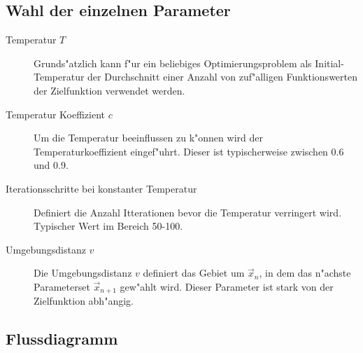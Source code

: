 \subsection{Wahl der einzelnen Parameter}
\begin{description}
\item [Temperatur $T$] $ $\\
Grunds"atzlich kann f"ur ein beliebiges Optimierungsproblem als
Initial-Tem\-pe\-ratur der Durchschnitt einer Anzahl von zuf"alligen
Funktionswerten der Zielfunktion verwendet werden.
\item [Temperatur Koeffizient $c$] $ $\\
Um die Temperatur beeinflussen zu k"onnen wird der Temperaturkoeffizient
eingef"uhrt. Dieser ist typischerweise zwischen 0.6 und 0.9.

\item [Iterationsschritte bei konstanter Temperatur]$ $\\
Definiert die Anzahl Itterationen bevor die Temperatur verringert wird.
Typischer Wert im Bereich 50-100.

\item [Umgebungsdistanz $v$]$ $\\
Die Umgebungsdistanz $v$ definiert das Gebiet um $\vec{x}_{n}$,
in dem das n"achste Parameterset $\vec{x}_{n+1}$ gew"ahlt wird.
Dieser Parameter ist stark von der Zielfunktion abh"angig.
\end{description}
		
\clearpage


\subsection{Flussdiagramm}

